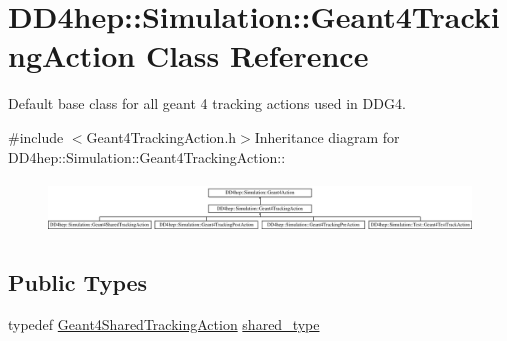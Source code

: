 \hypertarget{class_d_d4hep_1_1_simulation_1_1_geant4_tracking_action}{
\section{DD4hep::Simulation::Geant4TrackingAction Class Reference}
\label{class_d_d4hep_1_1_simulation_1_1_geant4_tracking_action}
}


Default base class for all geant 4 tracking actions used in DDG4.  


{\ttfamily \#include $<$Geant4TrackingAction.h$>$}Inheritance diagram for DD4hep::Simulation::Geant4TrackingAction::\begin{figure}[H]
\begin{center}
\leavevmode
\includegraphics[height=1.39535cm]{class_d_d4hep_1_1_simulation_1_1_geant4_tracking_action}
\end{center}
\end{figure}
\subsection*{Public Types}
\begin{DoxyCompactItemize}
\item 
typedef \hyperlink{class_d_d4hep_1_1_simulation_1_1_geant4_shared_tracking_action}{Geant4SharedTrackingAction} \hyperlink{class_d_d4hep_1_1_simulation_1_1_geant4_tracking_action_af42e74e119918be4046770f69c8c0266}{shared\_\-type}
\end{DoxyCompactItemize}
